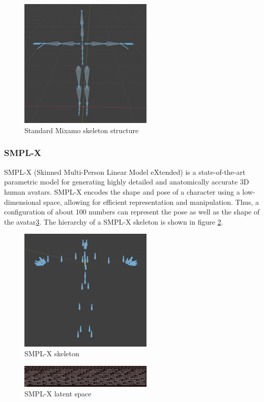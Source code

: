 \documentclass[../../main.tex]{subfiles}
\begin{document}
\begin{figure}
  \centering \includegraphics[width = 2.5in]{chapters/background_work/images/mixamo_skeleton.png}
  \caption{Standard Mixamo skeleton structure}
  \label{fig:mixamo_skeleton}
\end{figure}

\subsubsection{SMPL-X}

SMPL-X (Skinned Multi-Person Linear Model eXtended) is a state-of-the-art parametric model for generating highly detailed and anatomically accurate 3D human avatars. SMPL-X encodes the shape and pose of a character using a low-dimensional space, allowing for efficient representation and manipulation. Thus, a configuration of about 100 numbers can represent the pose as well as the shape of the avatar\ref{fig:latent_space_smplx}. The hierarchy of a SMPL-X skeleton is shown in figure \ref{fig:smpl_x_skeleton}.

\begin{figure}
  \centering \includegraphics[width = 2.5in]{chapters/background_work/images/smpl_x_skeleton.png}
  \caption{SMPL-X skeleton}
  \label{fig:smpl_x_skeleton}
\end{figure}

\begin{figure}
  \centering \includegraphics[width = 2.5in]{chapters/background_work/images/latent_space_smplx.png}
  \caption{SMPL-X latent space}
  \label{fig:latent_space_smplx}
\end{figure}
\end{document}
